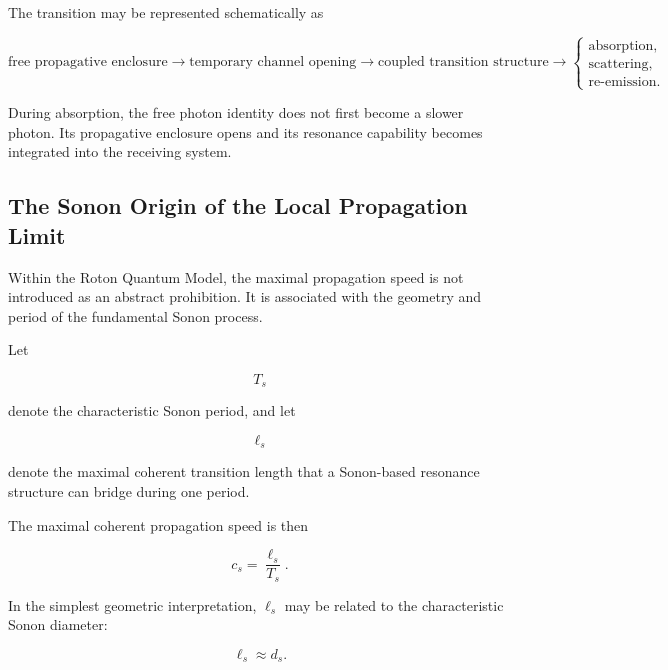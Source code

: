 \documentclass[11pt,a4paper]{article}
\begin{document}
The transition may be represented schematically as

\begin{equation}
    \text{free propagative enclosure}
    \rightarrow
    \text{temporary channel opening}
    \rightarrow
    \text{coupled transition structure}
    \rightarrow
    \begin{cases}
        \text{absorption},\\
        \text{scattering},\\
        \text{re-emission}.
    \end{cases}
\end{equation}

During absorption, the free photon identity does not first become a slower photon. Its propagative enclosure opens and its resonance capability becomes integrated into the receiving system.


\subsection{The Sonon Origin of the Local Propagation Limit}
\label{sec:sonon_origin_c}

Within the Roton Quantum Model, the maximal propagation speed is not introduced as an abstract prohibition. It is associated with the geometry and period of the fundamental Sonon process.

Let

\begin{equation}
    T_s
\end{equation}

denote the characteristic Sonon period, and let

\begin{equation}
    \ell_s
\end{equation}

denote the maximal coherent transition length that a Sonon-based resonance structure can bridge during one period.

The maximal coherent propagation speed is then

\begin{equation}
    c_s
    =
    \frac{\ell_s}{T_s}.
    \label{eq:sonon_propagation_speed}
\end{equation}

In the simplest geometric interpretation, $\ell_s$ may be related to the characteristic Sonon diameter:

\begin{equation}
    \ell_s
    \approx
    d_s.
\end{equation}
\end{document}
